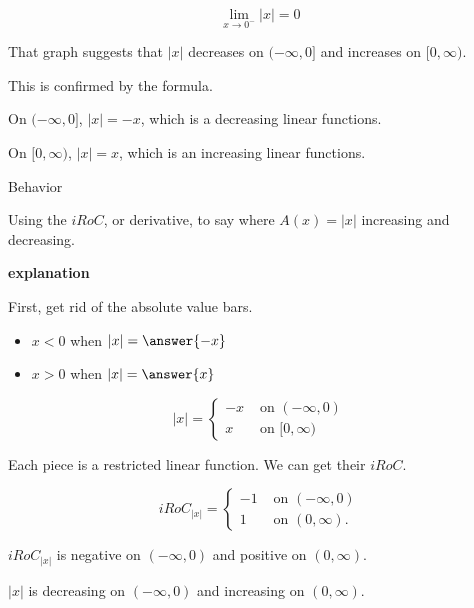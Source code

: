 \documentclass{ximera}
\begin{document}
\[
\lim\limits_{x \to 0^-} |x| = 0
\]






That graph suggests that $|x|$ decreases on $(-\infty, 0]$  and  increases on $[0, \infty )$.  

This is confirmed by the formula. 


On $(-\infty, 0]$, $|x| = -x$, which is a decreasing linear functions. 


On $[0, \infty)$, $|x| = x$, which is an increasing linear functions. 









\begin{example}  Behavior 


Using the $iRoC$, or derivative, to say where $A(x) = | x |$ increasing and decreasing. 



\textbf{\textcolor{red!75!green}{explanation}} 


First, get rid of the absolute value bars.

\begin{itemize}
\item $x < 0$ when $|x| = \answer{-x}$
\item $x > 0$ when $|x| = \answer{x}$
\end{itemize}



\[
|x| = 
\begin{cases}
  -x & \text{ on } (-\infty, 0)   \\
  x  & \text{ on } [0, \infty)
\end{cases}
\]



Each piece is a restricted linear function.  We can get their $iRoC$.


\[
iRoC_{|x|} = 
\begin{cases}
  -1 & \text{ on } (-\infty, 0)   \\
  1  & \text{ on } (0, \infty).
\end{cases}
\]

$iRoC_{|x|}$ is negative on $(-\infty, 0)$ and positive on $(0, \infty)$. 


$| x |$ is decreasing on $(-\infty, 0)$ and increasing on $(0, \infty)$.






\end{example}
\end{document}
